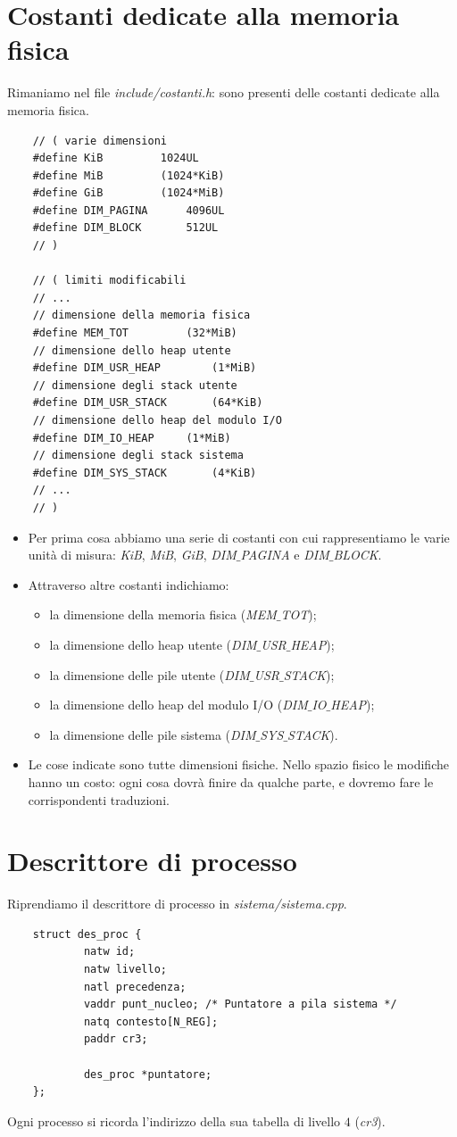 \documentclass[11pt]{report}
\theoremstyle{definition}
\begin{document}
\section{Costanti dedicate alla memoria fisica}
Rimaniamo nel file \emph{include/costanti.h}: sono presenti delle costanti dedicate alla memoria fisica.
\small 
\begin{verbatim}
	// ( varie dimensioni
	#define KiB			1024UL
	#define MiB			(1024*KiB)
	#define GiB			(1024*MiB)
	#define DIM_PAGINA		4096UL
	#define DIM_BLOCK		512UL
	// )
	
	// ( limiti modificabili
	// ...
	// dimensione della memoria fisica
	#define MEM_TOT			(32*MiB)
	// dimensione dello heap utente
	#define DIM_USR_HEAP		(1*MiB)
	// dimensione degli stack utente
	#define DIM_USR_STACK		(64*KiB)
	// dimensione dello heap del modulo I/O
	#define DIM_IO_HEAP		(1*MiB)
	// dimensione degli stack sistema
	#define DIM_SYS_STACK		(4*KiB)
	// ...
	// )
\end{verbatim}
\normalsize 
\begin{itemize}
	\item Per prima cosa abbiamo una serie di costanti con cui rappresentiamo le varie unità di misura: \emph{KiB}, \emph{MiB}, \emph{GiB}, \emph{DIM$\_$PAGINA} e \emph{DIM$\_$BLOCK}.
	\item Attraverso altre costanti indichiamo:
	\begin{itemize}
		\item la dimensione della memoria fisica (\emph{MEM$\_$TOT});
		\item la dimensione dello heap utente (\emph{DIM$\_$USR$\_$HEAP});
		\item la dimensione delle pile utente (\emph{DIM$\_$USR$\_$STACK});
		\item la dimensione dello heap del modulo I/O (\emph{DIM$\_$IO$\_$HEAP});
		\item la dimensione delle pile sistema (\emph{DIM$\_$SYS$\_$STACK}).
	\end{itemize}
	\item Le cose indicate sono tutte dimensioni fisiche. Nello spazio fisico le modifiche hanno un costo: ogni cosa dovrà finire da qualche parte, e dovremo fare le corrispondenti traduzioni.
\end{itemize}

\section{Descrittore di processo}
Riprendiamo il descrittore di processo in \emph{sistema/sistema.cpp}. 
\small 
\begin{verbatim}	
	struct des_proc {
		    natw id;
		    natw livello;
		    natl precedenza;
		    vaddr punt_nucleo; /* Puntatore a pila sistema */
		    natq contesto[N_REG];
		    paddr cr3;
		
		    des_proc *puntatore;
	};
\end{verbatim}
\normalsize 
Ogni processo si ricorda l'indirizzo della sua tabella di livello $4$ (\emph{cr3}). 
\end{document}
